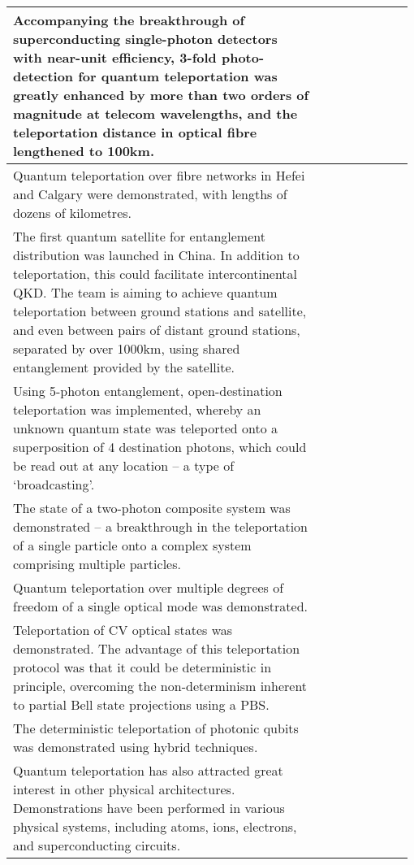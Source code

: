 \begin{table*}[!htbp]
\begin{tabular}{|p{0.755\linewidth}|p{0.22\linewidth}|}
	\hline
	Accompanying the breakthrough of superconducting single-photon detectors with near-unit efficiency, 3-fold photo-detection for quantum teleportation was greatly enhanced by more than two orders of magnitude at telecom wavelengths, and the teleportation distance in optical fibre lengthened to 100km. & \cite{bib:Optica_2_832} \\
	\hline
	Quantum teleportation over fibre networks in Hefei and Calgary were demonstrated, with lengths of dozens of kilometres. & \cite{bib:sun2016quantum, bib:Nat_Phot_10_676} \\
	\hline
	The first quantum satellite for entanglement distribution was launched in China. In addition to teleportation, this could facilitate intercontinental QKD. The team is aiming to achieve quantum teleportation between ground stations and satellite, and even between pairs of distant ground stations, separated by over 1000km, using shared entanglement provided by the satellite. & \cite{bib:Nat_535_478} \\
	\hline
	Using 5-photon entanglement, open-destination teleportation was implemented, whereby an unknown quantum state was teleported onto a superposition of 4 destination photons, which could be read out at any location -- a type of `broadcasting'. & \cite{bib:zhao2004experimental} \\
	\hline
	The state of a two-photon composite system was demonstrated -- a breakthrough in the teleportation of a single particle onto a complex system comprising multiple particles. & \cite{bib:Nat_Phys_2_678} \\
	\hline
	Quantum teleportation over multiple degrees of freedom of a single optical mode was demonstrated. & \cite{bib:Nat_518_516} \\
	\hline
	Teleportation of CV optical states was demonstrated. The advantage of this teleportation protocol was that it could be deterministic in principle,  overcoming the non-determinism inherent to partial Bell state projections using a PBS. & \cite{bib:Science_282_706} \\
	\hline
	The deterministic teleportation of photonic qubits was demonstrated using hybrid techniques. & \cite{bib:Nat_500_315} \\
	\hline
	Quantum teleportation has also attracted great interest in other physical architectures. Demonstrations have been performed in various physical systems, including atoms, ions, electrons, and superconducting circuits. & \cite{bib:Nat_Phys_9_400, bib:Nat_429_734, bib:Nat_429_737, bib:Science_345_532, bib:Nat_500_319} \\

\end{tabular}
\end{table*}
